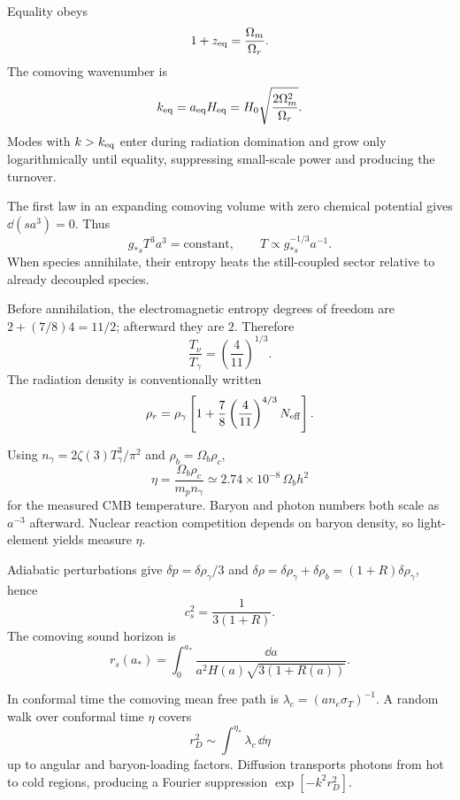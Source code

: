 \begin{solution}
Equality obeys
\[
1+z_{\rm eq}=\frac{\Omega_m}{\Omega_r}.
\]
The comoving wavenumber is
\[
k_{\rm eq}=a_{\rm eq}H_{\rm eq}
=H_0\sqrt{\frac{2\Omega_m^2}{\Omega_r}}.
\]
Modes with \(k>k_{\rm eq}\) enter during radiation domination and grow only
logarithmically until equality, suppressing small-scale power and producing
the turnover.
\end{solution}

\begin{solution}
The first law in an expanding comoving volume with zero chemical potential
gives \(\dd(sa^3)=0\).  Thus
\[
g_{\ast s}T^3a^3=\text{constant},\qquad
T\propto g_{\ast s}^{-1/3}a^{-1}.
\]
When species annihilate, their entropy heats the still-coupled sector relative
to already decoupled species.
\end{solution}

\begin{solution}
Before annihilation, the electromagnetic entropy degrees of freedom are
\(2+(7/8)4=11/2\); afterward they are \(2\).  Therefore
\[
\frac{T_\nu}{T_\gamma}=\left(\frac4{11}\right)^{1/3}.
\]
The radiation density is conventionally written
\[
\rho_r=\rho_\gamma\left[1+\frac78\left(\frac4{11}\right)^{4/3}N_{\rm eff}\right].
\]
\end{solution}

\begin{solution}
Using \(n_\gamma=2\zeta(3)T_\gamma^3/\pi^2\) and
\(\rho_b=\Omega_b\rho_c\),
\[
\eta=\frac{\Omega_b\rho_c}{m_p n_\gamma}
\simeq2.74\times10^{-8}\,\Omega_bh^2
\]
for the measured CMB temperature.  Baryon and photon numbers both scale as
\(a^{-3}\) afterward.  Nuclear reaction competition depends on baryon density,
so light-element yields measure \(\eta\).
\end{solution}

\begin{solution}
Adiabatic perturbations give
\(\delta p=\delta\rho_\gamma/3\) and
\(\delta\rho=\delta\rho_\gamma+\delta\rho_b
=(1+R)\delta\rho_\gamma\), hence
\[
c_s^2=\frac{1}{3(1+R)}.
\]
The comoving sound horizon is
\[
r_s(a_\ast)=\int_0^{a_\ast}
\frac{\dd a}{a^2H(a)\sqrt{3(1+R(a))}}.
\]
\end{solution}

\begin{solution}
In conformal time the comoving mean free path is
\(\lambda_c=(a n_e\sigma_T)^{-1}\).  A random walk over conformal time
\(\eta\) covers
\[
r_D^2\sim\int^{\eta_\ast}\lambda_c\,\dd\eta
\]
up to angular and baryon-loading factors.  Diffusion transports photons from
hot to cold regions, producing a Fourier suppression
\(\exp[-k^2r_D^2]\).
\end{solution}

